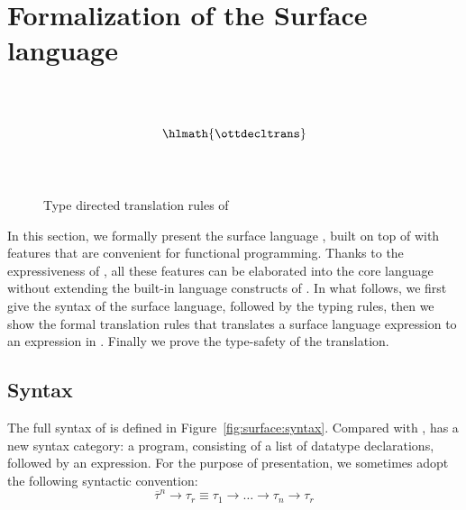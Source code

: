 \section{Formalization of the Surface language}
\label{sec:surface}

\begin{figure*}
\small
\centering
\renewcommand{\ottinterrule}{\\[1.0mm]}
\renewcommand{\ottdrule}[4][]{{\inferrule{#2 }{#3}\,\ottdrulename{#4}}}
\renewenvironment{ottdefnblock}[3][]{\raggedright \framebox{\mbox{#2}} \quad #3 \\[0pt]}{}
\renewcommand{\ottusedrule}[1]{$#1\quad$}
\ottdefnctxtrans{}\ottinterrule
\ottdefnpgmtrans{}\ottinterrule
\ottdefndecltrans{}
\[\hlmath{\ottdecltrans}\]\ottinterrule %
\ottdefnpattrans{}\\
\setlength{\lineskip}{8pt}
\ottdefnexprtrans{}
\caption{Type directed translation rules of \sufcc}
\label{fig:source:translate}
\end{figure*}


In this section, we formally present the surface language \sufcc,
built on top of \name with features that are convenient for functional
programming. Thanks to the expressiveness of \name, all these features
can be elaborated into the core language without extending the
built-in language constructs of \name. In what follows, we first give
the syntax of the surface language, followed by the typing rules, then
we show the formal translation rules that translates a surface
language expression to an expression in \name. Finally we prove the
type-safety of the translation.

\subsection{Syntax}

The full syntax of \sufcc is defined in
Figure~\ref{fig:surface:syntax}. Compared with \name, \sufcc has a new
syntax category: a program, consisting of a list of datatype
declarations, followed by an expression. For the purpose of
presentation, we sometimes adopt the following syntactic convention:
\[
\overline{\tau}^n \rightarrow \tau_r \equiv \tau_1 \rightarrow \dots \rightarrow \tau_n \rightarrow \tau_r
\]

